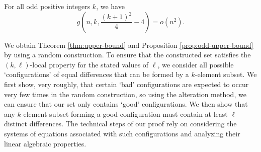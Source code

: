 \begin{proposition}\label{prop:odd-upper-bound}
    For all odd positive integers $k$, we have \[g\left(n, k, \frac{(k + 1)^2}{4} - 4\right) = o(n^2).\] 
\end{proposition}

We obtain Theorem \ref{thm:upper-bound} and Proposition \ref{prop:odd-upper-bound} by using a random construction. To ensure that the constructed set satisfies the $(k, \ell)$-local property for the stated values of $\ell$, we consider all possible `configurations' of equal differences that can be formed by a $k$-element subset. We first show, very roughly, that certain `bad' configurations are expected to occur very few times in the random construction, so using the alteration method, we can ensure that our set only contains `good' configurations. We then show that any $k$-element subset forming a good configuration must contain at least $\ell$ distinct differences. The technical steps of our proof rely on considering the systems of equations associated with such configurations and analyzing their linear algebraic properties. 
